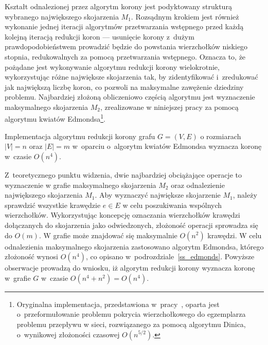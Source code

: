 \par{
  Kształt odnalezionej przez algorytm korony jest podyktowany strukturą wybranego największego skojarzenia $M_1$.
  Rozsądnym krokiem jest również wykonanie jednej iteracji algorytmów przetwarzania wstępnego przed każdą kolejną iteracją redukcji koron --- usunięcie korony z~dużym prawdopodobieństwem prowadzić będzie do powstania wierzchołków niskiego stopnia, redukowalnych za pomocą przetwarzania wstępnego.
  Oznacza to, że pożądane jest wykonywanie algorytmu redukcji korony wielokrotnie, wykorzystując różne największe skojarzenia tak, by zidentyfikować i~zredukować jak największą liczbę koron, co pozwoli na maksymalne zawężenie dziedziny problemu.
  Najbardziej złożoną obliczeniowo częścią algorytmu jest wyznaczenie maksymalnego skojarzenia $M_2$, zrealizowane w niniejszej pracy za pomocą algorytmu kwiatów Edmondsa\footnote{
    Oryginalna implementacja, przedstawiona w~pracy~\cite{KernelizationAlgorithms04}, oparta jest o~przeformułowanie problemu pokrycia wierzchołkowego do egzemplarza problemu przepływu w sieci, rozwiązanego za pomocą algorytmu Dinica, o~wynikowej złożoności czasowej $O(n^{5/2})$.
  }.
}
\begin{theorem}
  Implementacja algorytmu redukcji korony grafu $G=(V,E)$ o rozmiarach $|V|=n$ oraz $|E|=m$ w~oparciu o~algorytm kwiatów Edmondsa wyznacza koronę w~czasie $O(n^{4})$.
\end{theorem}
\begin{bproof}
  Z~teoretycznego punktu widzenia, dwie najbardziej obciążające operacje to wyznaczenie w grafie maksymalnego skojarzenia $M_2$ oraz odnalezienie największego skojarzenia $M_1$.
  Aby wyznaczyć największe skojarzenie $M_1$, należy sprawdzić wszystkie krawędzie $e\in E$ w celu poszukiwania wspólnych wierzchołków.
  Wykorzystując koncepcję oznaczania wierzchołków krawędzi dołączanych do skojarzenia jako odwiedzonych, złożoność operacji sprowadza się do $O(m)$.
  W grafie może znajdować się maksymalnie $O(n^{2})$ krawędzi.
  W celu odnalezienia maksymalnego skojarzenia zastosowano algorytm Edmondsa, którego złożoność wynosi $O(n^{4})$, co opisano w~podrozdziale~\ref{ss_edmonds}.
  Powyższe obserwacje prowadzą do wniosku, iż algorytm redukcji korony wyznacza koronę w~grafie $G$ w~czasie $O(n^{4} + n^{2})=O(n^{4})$.
\end{bproof}
